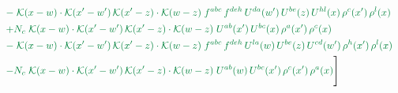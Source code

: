 \documentclass[10pt]{article}
\numberwithin{equation}{section}
\begin{document}
\begin{align}
&\quad{\color{JIM}-\;\mathcal{K}(x-w)\cdot\mathcal{K}(x'-w')\,\mathcal{K}(x'-z)\cdot\mathcal{K}(w-z)\;f^{abc}\,f^{deh}\,U^{da}(w')\,U^{be}(z)\,U^{hl}(x)\,\rho^{c}(x')\,\rho^{l}(x)}\notag\\
&\quad{\color{JIM}+N_c\;\mathcal{K}(x-w)\cdot\mathcal{K}(x'-w')\,\mathcal{K}(x'-z)\cdot\mathcal{K}(w-z)\;U^{ab}(x')\,U^{bc}(x)\,\rho^{a}(x')\,\rho^{c}(x)}\notag\\
&\quad{\color{JIM}-\;\mathcal{K}(x-w)\cdot\mathcal{K}(x'-w')\,\mathcal{K}(x'-z)\cdot\mathcal{K}(w-z)\;f^{abc}\,f^{deh}\,U^{la}(w)\,U^{be}(z)\,U^{cd}(w')\,\rho^{h}(x')\,\rho^{l}(x)}\notag\\
&\quad{\color{JIM}-N_c\;\mathcal{K}(x-w)\cdot\mathcal{K}(x'-w')\,\mathcal{K}(x'-z)\cdot\mathcal{K}(w-z)\;U^{ab}(w)\,U^{bc}(x')\,\rho^{c}(x')\,\rho^{a}(x)}\Bigg]\label{eq:gen7}
\end{align}
\end{document}
